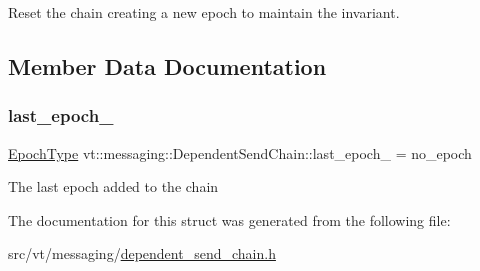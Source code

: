 Reset the chain creating a new epoch to maintain the invariant. 



\subsection{Member Data Documentation}
\mbox{\label{classvt_1_1messaging_1_1_dependent_send_chain_acbba3599015aff00654f3cb8efaba623}} 
\subsubsection{\texorpdfstring{last\+\_\+epoch\+\_\+}{last\_epoch\_}}
{\footnotesize\ttfamily \hyperlink{namespacevt_a985a5adf291c34a3ca263b3378388236}{Epoch\+Type} vt\+::messaging\+::\+Dependent\+Send\+Chain\+::last\+\_\+epoch\+\_\+ = no\+\_\+epoch\hspace{0.3cm}{\ttfamily [private]}}

The last epoch added to the chain 

The documentation for this struct was generated from the following file\+:\begin{DoxyCompactItemize}
\item 
src/vt/messaging/\hyperlink{dependent__send__chain_8h}{dependent\+\_\+send\+\_\+chain.\+h}\end{DoxyCompactItemize}
